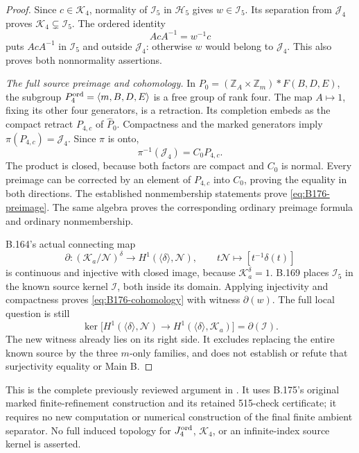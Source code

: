 \begin{proof}
Since \(c\in\mathcal K_4\), normality of \(\mathcal I_5\) in
\(\mathcal H_5\) gives \(w\in\mathcal I_5\). Its separation from
\(\mathcal J_4\) proves \(\mathcal K_4\subsetneq\mathcal I_5\).
The ordered identity
\[
                          AcA^{-1}=w^{-1}c
\]
puts \(AcA^{-1}\) in \(\mathcal I_5\) and outside \(\mathcal J_4\):
otherwise \(w\) would belong to \(\mathcal J_4\). This also proves
both nonnormality assertions.

\emph{The full source preimage and cohomology.}
In \(P_0=(\mathbb Z_A\times\mathbb Z_m)*F(B,D,E)\), the subgroup
\(P_4^{\rm ord}=\langle m,B,D,E\rangle\) is a free group of rank four.
The map \(A\mapsto1\), fixing its other four generators, is a retraction.
Its completion embeds as the compact retract \(P_{4,c}\) of
\(\widehat P_0\). Compactness and the marked generators imply
\(\pi(P_{4,c})=\mathcal J_4\). Since \(\pi\) is onto,
\[
                         \pi^{-1}(\mathcal J_4)=C_0P_{4,c}.
\]
The product is closed, because both factors are compact and \(C_0\)
is normal. Every preimage can be corrected by an element of
\(P_{4,c}\) into \(C_0\), proving the equality in both directions.
The established nonmembership statements prove
\eqref{eq:B176-preimage}. The same algebra proves the corresponding
ordinary preimage formula and ordinary nonmembership.

B.164's actual connecting map
\[
 \partial:(\mathcal K_a/\mathcal N)^\delta
 \longrightarrow H^1(\langle\delta\rangle,\mathcal N),
 \qquad t\mathcal N\longmapsto[t^{-1}\delta(t)]
\]
is continuous and injective with closed image, because
\(\mathcal K_a^\delta=1\). B.169 places \(\mathcal I_5\) in the
known source kernel \(\mathcal I\), both inside its domain. Applying
injectivity and compactness proves \eqref{eq:B176-cohomology} with
witness \(\partial(w)\). The full local question is still
\[
 \ker\bigl[H^1(\langle\delta\rangle,\mathcal N)
       \to H^1(\langle\delta\rangle,\mathcal K_a)\bigr]
                         =\partial(\mathcal I).
\]
The new witness already lies on its right side. It excludes replacing
the entire known source by the three \(m\)-only families, and does not
establish or refute that surjectivity equality or Main B.
\end{proof}

\begingroup\footnotesize\raggedright
This is the complete previously reviewed argument in
.
It uses B.175's original marked finite-refinement construction and its
retained 515-check certificate; it requires no new computation or numerical
construction of the final finite ambient separator. No full induced
topology for \(J_4^{\rm ord}\), \(\mathcal K_4\), or an infinite-index
source kernel is asserted.
\par\endgroup
